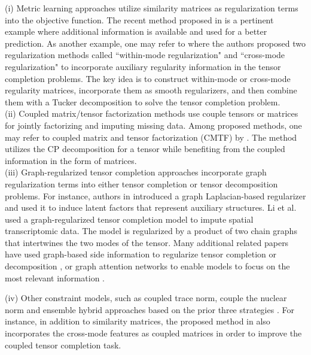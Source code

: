\documentclass{article}
\begin{document}
(i) Metric learning approaches utilize similarity matrices as regularization terms into the objective function. 
The recent method proposed in \cite{bagherian2021coupled} is a pertinent example where additional information is available and used for a better prediction. As another example, one may refer to \cite{narita2012tensor} where the authors proposed two regularization methods called ``within-mode regularization" and ``cross-mode regularization" to incorporate auxiliary regularity information in the tensor completion problems. The key idea is to construct within-mode or cross-mode regularity matrices, incorporate them as smooth regularizers, and then combine them with a Tucker decomposition to solve the tensor completion problem.\\

(ii) Coupled matrix/tensor factorization methods use couple tensors or matrices for jointly factorizing and imputing missing data. Among proposed methods, one may refer to coupled matrix and tensor factorization (CMTF) by \cite{acar2014structure}. The method utilizes the CP decomposition for a tensor while benefiting from the coupled information in the form of matrices.  \\

(iii) Graph-regularized tensor completion approaches incorporate graph regularization terms into either tensor completion or tensor decomposition problems. For instance, authors in \cite{takeuchi2016graph} introduced a graph Laplacian-based regularizer and used it to induce latent factors that represent auxiliary structures. Li et al. \cite{li2021imputation} used a graph-regularized tensor completion model to impute spatial transcriptomic data. The model is regularized by a product of two chain graphs that intertwines the two modes of the tensor. Many additional related papers have used graph-based side information to regularize tensor completion or decomposition \cite{sofuoglu2020graph}, or graph attention networks to enable models to focus on the most relevant information \cite{zhao2025regulation}. 



(iv) Other constraint models, such as coupled trace norm\cite{wimalawarne2018convex}, couple the nuclear norm \cite{wimalawarne2018efficient} and ensemble hybrid approaches based on the prior three strategies \cite{ge2016taper}. For instance,  in addition to similarity matrices, the proposed method in \cite{ge2016taper} also incorporates the cross-mode features  as coupled matrices in order to improve the coupled tensor completion task.
\end{document}
